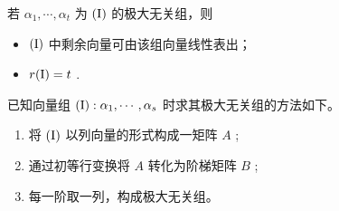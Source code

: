 
若 $ \alpha_1,\cdots,\alpha_t $ 为 $ \rm (I) $ 的极大无关组，则
\begin{itemize}
    \item $ \rm (I) $ 中剩余向量可由该组向量线性表出；
    \item $ r({\rm I}) = t $ .
\end{itemize}


已知向量组 $ {\rm (I)}: \alpha_1,\cdots,\alpha_s $ 时求其极大无关组的方法如下。

\begin{enumerate}
    \item 将 $ \rm (I) $ 以列向量的形式构成一矩阵 $ A $ ;
    \item 通过初等行变换将 $ A $ 转化为阶梯矩阵 $ B $ ;
    \item 每一阶取一列，构成极大无关组。
\end{enumerate}

